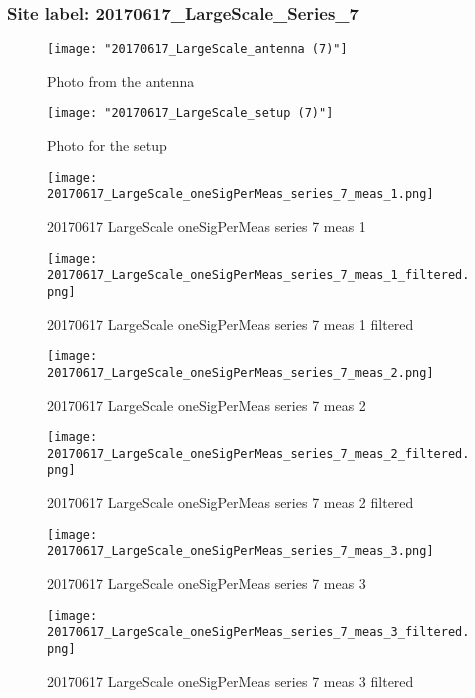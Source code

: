\subsubsection{Site label: 20170617\_LargeScale\_Series\_7}
\begin{figure}[ht] \caption{Photo from the antenna}
\texttt{[image: "20170617\_LargeScale\_antenna (7)"]}\centering\end{figure}
\begin{figure}[ht] \caption{Photo for the setup}
\texttt{[image: "20170617\_LargeScale\_setup (7)"]}\centering\end{figure}
\begin{figure}[ht] \caption{20170617 LargeScale oneSigPerMeas series 7 meas 1}
\texttt{[image: 20170617\_LargeScale\_oneSigPerMeas\_series\_7\_meas\_1.png]}\centering\end{figure}
\begin{figure}[ht] \caption{20170617 LargeScale oneSigPerMeas series 7 meas 1 filtered}
\texttt{[image: 20170617\_LargeScale\_oneSigPerMeas\_series\_7\_meas\_1\_filtered.png]}\centering\end{figure}
\begin{figure}[ht] \caption{20170617 LargeScale oneSigPerMeas series 7 meas 2}
\texttt{[image: 20170617\_LargeScale\_oneSigPerMeas\_series\_7\_meas\_2.png]}\centering\end{figure}
\begin{figure}[ht] \caption{20170617 LargeScale oneSigPerMeas series 7 meas 2 filtered}
\texttt{[image: 20170617\_LargeScale\_oneSigPerMeas\_series\_7\_meas\_2\_filtered.png]}\centering\end{figure}
\begin{figure}[ht] \caption{20170617 LargeScale oneSigPerMeas series 7 meas 3}
\texttt{[image: 20170617\_LargeScale\_oneSigPerMeas\_series\_7\_meas\_3.png]}\centering\end{figure}
\begin{figure}[ht] \caption{20170617 LargeScale oneSigPerMeas series 7 meas 3 filtered}
\texttt{[image: 20170617\_LargeScale\_oneSigPerMeas\_series\_7\_meas\_3\_filtered.png]}\centering\end{figure}
\clearpage
